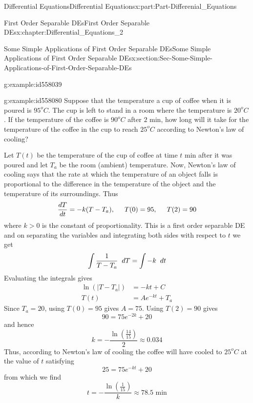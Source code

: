 \documentclass[oneside,10pt,]{book}
\numberwithin{equation}{section}
\newcommand{\gt}{>}
\newcommand{\amp}{&}
\begin{document}
\begin{partptx}{Differential Equations}{}{Differential Equations}{}{}{x:part:Part-Differenial_Equations}
\begin{chapterptx}{First Order Separable DEs}{}{First Order Separable DEs}{}{}{x:chapter:Differential_Equations_2}
\begin{sectionptx}{Some Simple Applications of First Order Separable DEs}{}{Some Simple Applications of First Order Separable DEs}{}{}{x:section:Sec-Some-Simple-Applications-of-First-Order-Separable-DEs}
\begin{example}{}{g:example:id558039}
%
\end{example}
\begin{example}{}{g:example:id558080}%
Suppose that the temperature a cup of coffee when it is poured is \(95^oC\). The cup is left to stand in a room where the temperature is \(20^oC\). If the temperature of the coffee is \(90^oC\) after \(2\) min, how long will it take for the temperature of the coffee in the cup to reach \(25^oC\) according to Newton’s law of cooling?%
\par\smallskip%
\noindent\hypertarget{g:solution:id558108}{}Let \(T(t)\) be the temperature of the cup of coffee at time \(t\) min after it was poured and let \(T_a\) be the room (ambient) temperature. Now, Newton’s law of cooling says that the rate at which the temperature of an object falls is proportional to the difference in the temperature of the object and the temperature of its surroundings. Thus%
\begin{equation*}
\frac{dT}{dt}=-k(T-T_a), \hspace{5mm} T(0)=95, \hspace{5mm} T(2)=90
\end{equation*}
where \(k\gt 0\) is the constant of proportionality. This is a first order separable DE and on separating the variables and integrating both sides with respect to \(t\) we get%
\begin{equation*}
\int \frac{1}{T-T_a}\hspace{2mm}dT=\int -k\hspace{2mm}dt
\end{equation*}
Evaluating the integrals gives %
\begin{align*}
\ln(\vert T-T_a\vert) \amp=-kt+C\\
T(t) \amp =Ae^{-kt}+T_a
\end{align*}
%
 Since \(T_a=20\), using \(T(0)=95\) gives \(A=75\). Using \(T(2)=90\) gives%
\begin{equation*}
90=75e^{-2k}+20
\end{equation*}
and hence%
\begin{equation*}
k=-\frac{\ln(\frac{14}{15})}{2}\approx 0.034
\end{equation*}
Thus, according to Newton’s law of cooling the coffee will have cooled to \(25^oC\) at the value of \(t\) satisfying%
\begin{equation*}
25=75e^{-kt}+20
\end{equation*}
from which we find%
\begin{equation*}
t=-\frac{\ln(\frac{1}{15})}{k}\approx 78.5 \textrm{ min}

\end{equation*}
\end{example}
\end{sectionptx}
\end{chapterptx}
\end{partptx}
\end{document}
